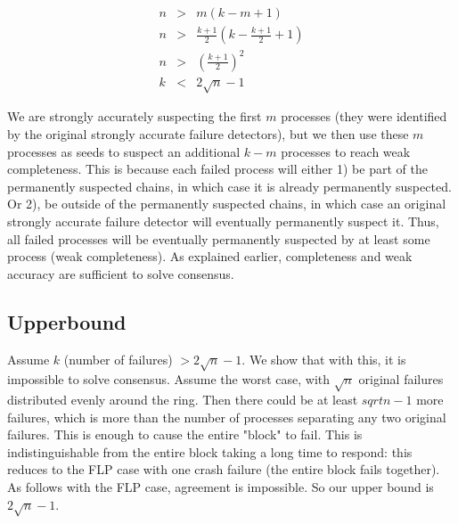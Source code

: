 \documentclass{article}
\begin{document}
\begin{eqnarray}
	n &>& m(k-m+1) \nonumber \\
	n &>& \frac{k+1}{2} (k - \frac{k+1}{2} + 1)  \nonumber  \\
	n &>& (\frac{k+1}{2} )^2  \nonumber  \\
	k &<& 2\sqrt{n} -1 \nonumber
\end{eqnarray}
	
We are strongly accurately suspecting the first $m$ processes (they were identified by the original strongly accurate failure detectors), but we then use these $m$ processes as seeds to suspect an additional $k-m$ processes to reach weak completeness. This is because each failed process will either 1) be part of the permanently suspected chains, in which case it is already permanently suspected. Or 2), be outside of the permanently suspected chains, in which case an original strongly accurate failure detector will eventually permanently suspect it. 
Thus, all failed processes  will be eventually permanently suspected by at least some process (weak completeness). As explained  earlier, completeness and weak accuracy are sufficient to solve consensus.

\subsection{Upperbound}
	Assume $k$ (number of failures) $> 2\sqrt{n} - 1$. We show that with this, it is impossible to solve consensus. Assume the worst case, with $\sqrt{n}$ original failures distributed evenly around the ring. Then there could be at least $sqrt{n} - 1$ more failures, which is more than the number of processes separating any two original failures. This is enough to cause the entire "block" to fail. This is indistinguishable from the entire block taking a long time to respond: this reduces to the FLP case with one crash failure (the entire block fails together). As follows with the FLP case, agreement is impossible. So our upper bound is $2\sqrt{n} - 1$.
\end{document}
